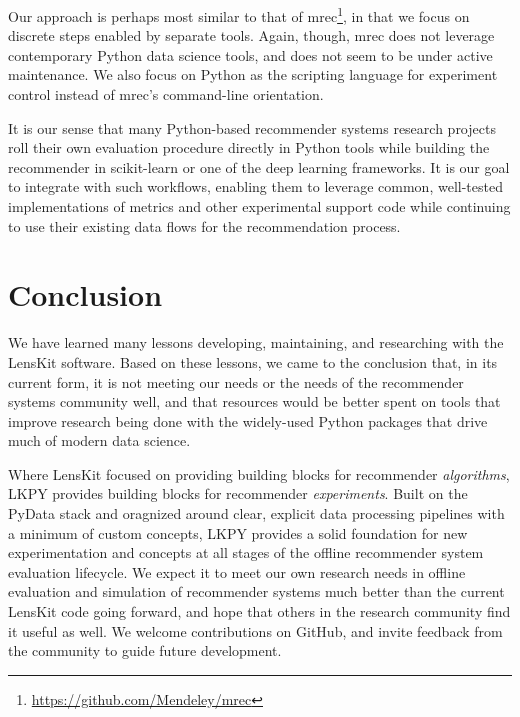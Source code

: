 Our approach is perhaps most similar to that of mrec\footnote{\url{https://github.com/Mendeley/mrec}}, in that we focus on discrete steps enabled by separate tools.
Again, though, mrec does not leverage contemporary Python data science tools, and does not seem to be under active maintenance.
We also focus on Python as the scripting language for experiment control instead of mrec's command-line orientation.

It is our sense that many Python-based recommender systems research projects roll their own evaluation procedure directly in Python tools while building the recommender in scikit-learn or one of the deep learning frameworks.
It is our goal to integrate with such workflows, enabling them to leverage common, well-tested implementations of metrics and other experimental support code while continuing to use their existing data flows for the recommendation process.

\section{Conclusion}

We have learned many lessons developing, maintaining, and researching with the LensKit software.
Based on these lessons, we came to the conclusion that, in its current form, it is not meeting our needs or the needs of the recommender systems community well, and that resources would be better spent on tools that improve research being done with the widely-used Python packages that drive much of modern data science.

Where LensKit focused on providing building blocks for recommender \emph{algorithms}, LKPY provides building blocks for recommender \emph{experiments}.
Built on the PyData stack and oragnized around clear, explicit data processing pipelines with a minimum of custom concepts, LKPY provides a solid foundation for new experimentation and concepts at all stages of the offline recommender system evaluation lifecycle.
We expect it to meet our own research needs in offline evaluation and simulation of recommender systems much better than the current LensKit code going forward, and hope that others in the research community find it useful as well.
We welcome contributions on GitHub, and invite feedback from the community to guide future development.
